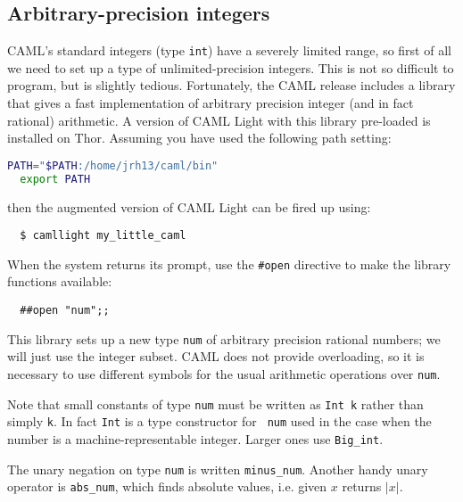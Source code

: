 \subsection{Arbitrary-precision integers}

CAML's standard integers (type {\tt int}) have a severely limited range, so
first of all we need to set up a type of unlimited-precision integers. This is
not so difficult to program, but is slightly tedious. Fortunately, the CAML
release includes a library that gives a fast implementation of arbitrary
precision integer (and in fact rational) arithmetic. A version of CAML Light
with this library pre-loaded is installed on Thor. Assuming you have used the
following path setting:

\begin{boxed}\begin{lstlisting}[language=sh]
  PATH="$PATH:/home/jrh13/caml/bin"
  export PATH
\end{lstlisting}\end{boxed}

\noindent then the augmented version of CAML Light can be fired up using:

\begin{boxed}\begin{verbatim}
  $ camllight my_little_caml
\end{verbatim}\end{boxed}

When the system returns its prompt, use the {\verb+#open+} directive to make
the library functions available:

\begin{boxed}\begin{verbatim}
  ##open "num";;
\end{verbatim}\end{boxed}

This library sets up a new type {\tt num} of arbitrary precision rational
numbers; we will just use the integer subset. CAML does not provide
overloading, so it is necessary to use different symbols for the usual
arithmetic operations over {\tt num}.

Note that small constants of type {\tt num} must be written as {\tt Int k}
rather than simply {\tt k}. In fact {\tt Int} is a type constructor for {\tt
num} used in the case when the number is a machine-representable integer.
Larger ones use {\tt Big\_int}.

The unary negation on type {\tt num} is written {\tt minus\_num}. Another handy
unary operator is {\tt abs\_num}, which finds absolute values, i.e. given $x$
returns $|x|$.

